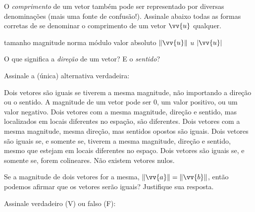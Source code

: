 \documentclass[pdftex, brazil, 12pt, oneside, addpoints]{exam}
\newcommand{\treslinhas}{\fillwithlines{0.75in}}
\newcommand{\cincolinhas}{\fillwithlines{1.25in}}
\newcommand{\vf}[1][{}]{%
  \fillin[#1][0.25in]%
}
\newcommand{\vetor}[1]{\ensuremath{\vv{#1}}}
\begin{document}
\begin{questions}
\question
O \emph{comprimento} de um vetor também pode ser representado por
diversas denominações (mais uma fonte de confusão!). Assinale abaixo
todas as formas corretas de se denominar o comprimento de um vetor
\vetor{u} qualquer.
\begin{checkboxes}
  \choice tamanho
  \choice magnitude
  \choice norma
  \choice módulo
  \choice valor absoluto
  \choice $\lVert \vetor{u} \rVert$
  \choice $u$
  \choice $|\vetor{u}|$
\end{checkboxes}

\question
O que significa a \emph{direção} de um vetor? E o \emph{sentido}?
\cincolinhas

\question
Assinale a (única) alternativa verdadeira:
\begin{checkboxes}
  \choice Dois vetores são iguais se tiverem a mesma magnitude, não
  importando a direção ou o sentido.
  \choice A magnitude de um vetor pode ser 0, um valor positivo, ou um
  valor negativo.
  \choice Dois vetores com a mesma magnitude, direção e sentido, mas
  localizados em locais diferentes no espação, são diferentes.
  \choice Dois vetores com a mesma magnitude, mesma direção, mas
  sentidos opostos são iguais.
  \choice Dois vetores são iguais se, e somente se, tiverem a mesma
  magnitude, direção e sentido, mesmo que estejam em locais diferentes
  no espaço.
  \choice Dois vetores são iguais se, e somente se, forem colineares.
  \choice Não existem vetores nulos.
\end{checkboxes}

\question
Se a magnitude de dois vetores for a mesma, $\lVert \vetor{a} \rVert =
\lVert \vetor{b} \rVert$, então podemos afirmar que os vetores serão
iguais? Justifique sua resposta.
\treslinhas

\question
Assinale verdadeiro (V) ou falso (F):


\end{questions}
\end{document}

